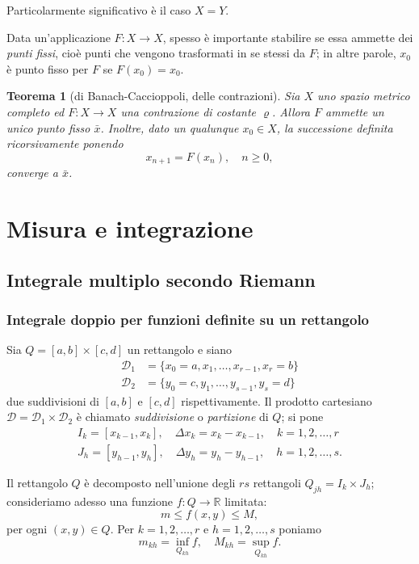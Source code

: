 \documentclass[a4paper]{book}
\numberwithin{equation}{section}
\renewcommand{\rho}{\varrho}
\theoremstyle{plain}
\newtheorem{teor}{Teorema}[section]
\theoremstyle{definition}
\theoremstyle{remark}
\theoremstyle{example}
\begin{document}
	Particolarmente significativo è il caso $X = Y$.

	Data un'applicazione $F \colon X \to X$, spesso è importante stabilire se essa ammette dei \emph{punti fissi}, cioè punti che vengono trasformati in se stessi da $F$; in altre parole, $x_0$ è punto fisso per $F$ se $F(x_0) = x_0$.

		\begin{teor}[di Banach-Caccioppoli, delle contrazioni]
			Sia $X$ uno spazio metrico completo ed $F \colon X \to X$ una contrazione di costante $\rho$. Allora $F$ ammette un unico punto fisso $\bar{x}$. Inoltre, dato un qualunque $x_0 \in X$, la successione definita ricorsivamente ponendo
				\begin{equation}
					x_{n+1} = F(x_n), \quad n \ge 0,
				\end{equation}
			converge a $\bar{x}$.
		\end{teor}






\chapter{Misura e integrazione}
\section{Integrale multiplo secondo Riemann}
\subsection{Integrale doppio per funzioni definite su un rettangolo}
Sia $Q = [a, b] \times [c, d]$ un rettangolo e siano
	\begin{align*}
	\mathcal{D}_1 &= \{ x_0 = a, x_1, \dots, x_{r-1}, x_r = b\} \\
	\mathcal{D}_2 &= \{ y_0 = c, y_1, \dots, y_{s-1}, y_s = d \}
	\end{align*}
due suddivisioni di $[a, b]$ e $[c, d]$ rispettivamente. Il prodotto cartesiano $\mathcal{D} = \mathcal{D}_1 \times \mathcal{D}_2$ è chiamato \emph{suddivisione} o \emph{partizione} di $Q$; si pone
	\begin{align*}
	I_k = [x_{k-1}, x_k], \quad \Delta x_k = x_k - x_{k-1}, \quad k = 1, 2, \dots, r \\
	J_h = [y_{h-1}, y_h], \quad \Delta y_h = y_h - y_{h-1}, \quad h = 1, 2, \dots, s.
	\end{align*}

Il rettangolo $Q$ è decomposto nell'unione degli $rs$ rettangoli $Q_{jh} = I_k \times J_h$; consideriamo adesso una funzione $f \colon Q \to \mathbb{R}$ limitata:
	\begin{equation}
	\label{eqn:flimitata}
	m \le f(x, y) \le M,
	\end{equation}
per ogni $(x, y) \in Q$.
Per $k = 1, 2, \dots, r$ e $h = 1, 2, \dots, s$ poniamo
	\begin{equation}
	m_{kh} = \inf_{Q_{kh}}f, \quad M_{kh} = \sup_{Q_{kh}} f.
	\end{equation}
\end{document}

